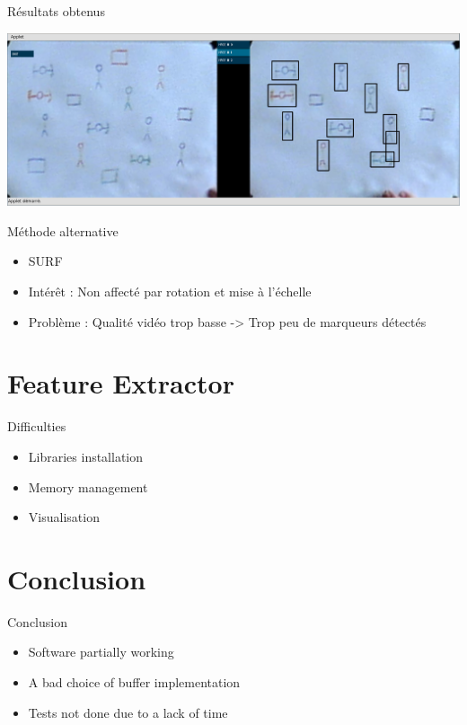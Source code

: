 \documentclass[t,14pt]{beamer}
\begin{document}
\begin{frame}{Résultats obtenus}
\vspace{5mm}
\begin{center}
\includegraphics[width=\textwidth]{images/capture2.png}
\end{center}
\end{frame}

\begin{frame}{Méthode alternative}
\vspace{5mm}
\begin{itemize}
\item SURF
\item Intérêt : Non affecté par rotation et mise à l'échelle 
\item Problème : Qualité vidéo trop basse -> Trop peu de marqueurs détectés
\end{itemize}
\end{frame}
	
\section[Extraction de nouveautés]{Feature Extractor}
	\begin{frame}{Difficulties}
		\vspace*{5mm}
	\begin{itemize}
	\item Libraries installation
	\item Memory management
	\item Visualisation
	\end{itemize}
	\end{frame}
	
\section[Conclusion]{Conclusion}
	\begin{frame}{Conclusion}
		\vspace*{5mm}
		\begin{itemize}
		\item Software partially working
		\item A bad choice of buffer implementation
		\item Tests not done due to a lack of time
		\end{itemize}
	\end{frame}
\end{document}
